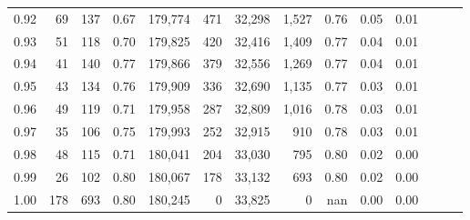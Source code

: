 \begin{tabular}{rrrrrrrrrrrrrr}
0.92 &      69 &  137 &  0.67 &  179,774 &      471 &  32,298 &   1,527 &  0.76 &  0.05 &      0.01 \\
0.93 &      51 &  118 &  0.70 &  179,825 &      420 &  32,416 &   1,409 &  0.77 &  0.04 &      0.01 \\
0.94 &      41 &  140 &  0.77 &  179,866 &      379 &  32,556 &   1,269 &  0.77 &  0.04 &      0.01 \\
0.95 &      43 &  134 &  0.76 &  179,909 &      336 &  32,690 &   1,135 &  0.77 &  0.03 &      0.01 \\
0.96 &      49 &  119 &  0.71 &  179,958 &      287 &  32,809 &   1,016 &  0.78 &  0.03 &      0.01 \\
0.97 &      35 &  106 &  0.75 &  179,993 &      252 &  32,915 &     910 &  0.78 &  0.03 &      0.01 \\
0.98 &      48 &  115 &  0.71 &  180,041 &      204 &  33,030 &     795 &  0.80 &  0.02 &      0.00 \\
0.99 &      26 &  102 &  0.80 &  180,067 &      178 &  33,132 &     693 &  0.80 &  0.02 &      0.00 \\
1.00 &     178 &  693 &  0.80 &  180,245 &        0 &  33,825 &       0 &   nan &  0.00 &      0.00 \\
\bottomrule
\end{tabular}
